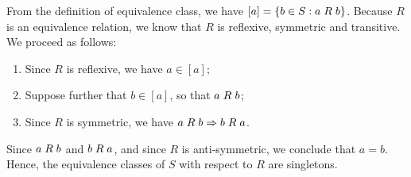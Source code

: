 \documentclass[a4paper,12pt]{article}
\begin{document}

From the definition of equivalence class, we have $[a] = \{b \in S : a \hspace{1mm} R \hspace{1mm} b\}$. Because $R$ is an equivalence relation, we know that $R$ is reflexive, symmetric and transitive. We proceed as follows: 

\begin{enumerate}
\item Since $R$ is reflexive, we have $a \in [a]$;
\item Suppose further that $b \in [a]$, so that $a \hspace{1mm} R \hspace{1mm} b$;
\item Since $R$ is symmetric, we have $a \hspace{1mm} R \hspace{1mm} b \Rightarrow b \hspace{1mm} R \hspace{1mm} a$.
\end{enumerate}
Since $a \hspace{1mm} R \hspace{1mm} b$ and $b \hspace{1mm} R \hspace{1mm} a$, and since $R$ is anti-symmetric, we conclude that $a = b$. Hence, the equivalence classes of $S$ with respect to $R$ are singletons. 

\vspace{5mm}
\end{document}
